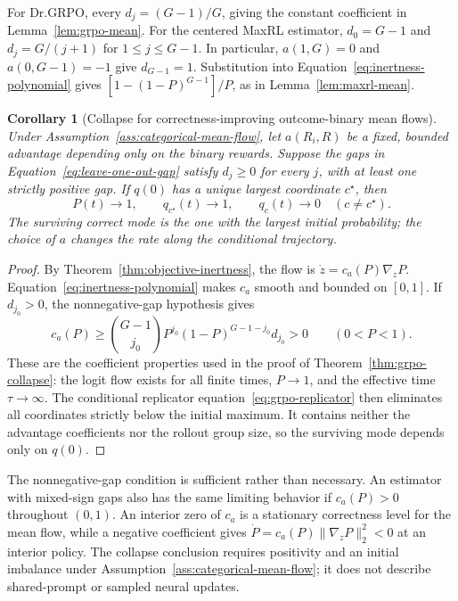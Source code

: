 \documentclass{article}
\newcommand{\enforcehalffinalproseline}{%
  \setlength{\parfillskip}{0pt plus .20\linewidth}}
\newcommand{\1}{\mathbf 1}
\newtheorem{corollary}[lemma]{Corollary}
\theoremstyle{remark}
\theoremstyle{definition}
\theoremstyle{plain}
\begin{document}
For Dr.GRPO, every $d_j=(G-1)/G$, giving the constant coefficient in
Lemma~\ref{lem:grpo-mean}. For the centered MaxRL estimator,
$d_0=G-1$ and $d_j=G/(j+1)$ for $1\le j\le G-1$.
In particular, $a(1,G)=0$ and $a(0,G-1)=-1$ give $d_{G-1}=1$.
Substitution into Equation~\eqref{eq:inertness-polynomial} gives
$[1-(1-P)^{G-1}]/P$, as in Lemma~\ref{lem:maxrl-mean}.

\begin{corollary}[Collapse for correctness-improving outcome-binary mean flows]
\enforcehalffinalproseline
\label{cor:class-collapse}
Under Assumption~\ref{ass:categorical-mean-flow}, let $a(R_i,R)$ be a fixed,
bounded advantage depending only on the binary rewards. Suppose the gaps
in Equation~\eqref{eq:leave-one-out-gap} satisfy $d_j\ge0$ for every $j$,
with at least one strictly positive gap. If $q(0)$ has a unique largest
coordinate $c^\star$, then
\[
 P(t)\longrightarrow1,\qquad
 q_{c^\star}(t)\longrightarrow1,\qquad
 q_c(t)\longrightarrow0\quad(c\ne c^\star).
\]
The surviving correct mode is the one with the largest initial probability;
the choice of $a$ changes the rate along the conditional trajectory.
\end{corollary}

\begin{proof}
\enforcehalffinalproseline
By Theorem~\ref{thm:objective-inertness}, the flow is
$\dot z=c_a(P)\nabla_zP$. Equation~\eqref{eq:inertness-polynomial} makes
$c_a$ smooth and bounded on $[0,1]$. If $d_{j_0}>0$, the nonnegative-gap
hypothesis gives
\[
 c_a(P)\ge\binom{G-1}{j_0}P^{j_0}(1-P)^{G-1-j_0}d_{j_0}>0
 \qquad(0<P<1).
\]
These are the coefficient properties used in the proof of
Theorem~\ref{thm:grpo-collapse}: the logit flow exists for all finite times,
$P\to1$, and the effective time $\tau\to\infty$. The conditional
replicator equation~\eqref{eq:grpo-replicator} then eliminates all coordinates
strictly below the initial maximum. It contains neither the advantage
coefficients nor the rollout group size, so the surviving mode depends only
on $q(0)$.
\end{proof}

The nonnegative-gap condition is sufficient rather than necessary. An
estimator with mixed-sign gaps also has the same limiting behavior if
$c_a(P)>0$ throughout $(0,1)$. An interior zero of $c_a$ is a stationary
correctness level for the mean flow, while a negative coefficient gives
$\dot P=c_a(P)\lVert\nabla_zP\rVert_2^2<0$ at an interior policy.
The collapse conclusion requires positivity and an initial imbalance under
Assumption~\ref{ass:categorical-mean-flow}; it does not describe shared-prompt
or sampled neural updates.
\end{document}
